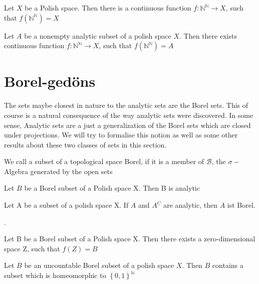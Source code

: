 \documentclass[10pt, a4paper, titlepage]{article}
\numberwithin{equation}{section}
\begin{document}
\begin{theorem}
	Let $X$ be a Polish space. Then there is a continuous function $f: \mathbb{N}^\mathbb{N} \to X $, such that $f\left( \mathbb{N}^\mathbb{N} \right) = X$
\end{theorem}


\begin{theorem}
	Let $A$ be a nonempty analytic subset of a polish space $X$. Then there exists continuous function $f: \mathbb{N}^{\mathbb{N}} \to X$, such that $f\left( \mathbb{N}^{\mathbb{N}} \right) = A$
\end{theorem}



\section{Borel-gedöns}
The sets maybe closest in nature to the analytic sets are the Borel sets. 
This of course is a natural consequence of the way analytic sets were discovered. 
In some sense, Analytic sets are a just a generalization of the Borel sets which are closed under projections. 
We will try to formalise this notion as well as some other results about these two classes of sets in this section.

\begin{definition}
	We call a subset of a topological space Borel, if it is a member of $\mathcal{B}$, the $\sigma-$Algebra generated by the open sets
\end{definition}


\begin{theorem}
	Let $B$ be a Borel subset of a Polish space X. Then B is analytic		
\end{theorem}

\begin{theorem}
	Let A be a subset of a polish space X. If $A$ and  $A^{C}$ are analytic, then $A$ ist Borel.  
\end{theorem}


\begin{definition}
	.	
\end{definition}

\begin{theorem}
	Let B be a Borel subset of a Polish space X. Then there exists a zero-dimensional space Z, such that $f(Z) = B$
\end{theorem}

\begin{theorem}
	Let $B$ be an uncountable Borel subset of a polish space  $X$. Then  $B$ contains a subset which is homeomorphic to  $\left\{ 0,1 \right\}^\mathbb{N}$
	
\end{theorem}
\end{document}
